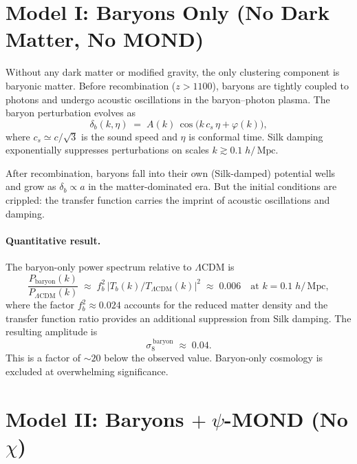 \documentclass[12pt,a4paper]{article}
\newcommand{\Mpc}{\,\mathrm{Mpc}}
\newcommand{\LCDM}{\Lambda\mathrm{CDM}}
\begin{document}
\section{Model I: Baryons Only (No Dark Matter, No MOND)}
\label{sec:baryons}

Without any dark matter or modified gravity, the only clustering
component is baryonic matter. Before recombination ($z > 1100$), baryons
are tightly coupled to photons and undergo acoustic oscillations in the
baryon--photon plasma. The baryon perturbation evolves as
\begin{equation}
  \delta_b(k,\eta) \;=\; A(k)\,\cos\!\bigl(k\,c_s\,\eta + \varphi(k)\bigr),
  \label{eq:baryon_osc}
\end{equation}
where $c_s \simeq c/\sqrt{3}$ is the sound speed and $\eta$ is conformal
time. Silk damping exponentially suppresses perturbations on scales
$k \gtrsim 0.1\;h/\Mpc$.

After recombination, baryons fall into their own (Silk-damped) potential
wells and grow as $\delta_b \propto a$ in the matter-dominated era. But
the initial conditions are crippled: the transfer function carries the
imprint of acoustic oscillations and damping.

\paragraph{Quantitative result.}
The baryon-only power spectrum relative to $\LCDM$ is
\begin{equation}
  \frac{P_{\mathrm{baryon}}(k)}{P_{\LCDM}(k)}
  \;\approx\; f_b^2 \,\bigl|T_b(k)/T_{\LCDM}(k)\bigr|^2
  \;\approx\; 0.006
  \quad\text{at } k = 0.1\;h/\Mpc,
\end{equation}
where the factor $f_b^2 \approx 0.024$ accounts for the reduced matter
density and the transfer function ratio provides an additional
suppression from Silk damping. The resulting amplitude is
\begin{equation}
  \boxed{\sigma_8^{\,\mathrm{baryon}} \;\approx\; 0.04.}
\end{equation}
This is a factor of $\sim\!20$ below the observed value. Baryon-only
cosmology is excluded at overwhelming significance.

\section{Model II: Baryons $+\;\psi$-MOND (No $\chi$)}
\label{sec:psi_alone}
\end{document}
